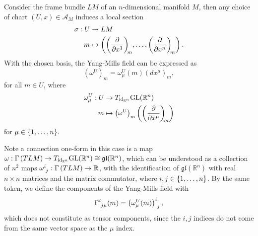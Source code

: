 \begin{example}
    Consider the frame bundle \(LM\) of an \(n\)-dimensional manifold \(M\), then any choice of chart \((U,x) \in \mathscr{A}_M\) induces a local section
    \begin{align*}
        \sigma : U &\to LM\\
                 m &\mapsto \left(\bvec{x^1}{m}, \dots, \bvec{x^n}{m}\right).
    \end{align*}
    With the chosen basis, the Yang-Mills field can be expressed as
    \begin{equation*}
        \left(\omega^U\right)_m = \omega^U_\mu (m) \left(dx^\mu\right)_m,
    \end{equation*}
    for all \(m \in U\), where
    \begin{align*}
        \omega^U_\mu : U &\to T_{\id{\mathbb{R}^n}}\mathrm{GL}(\mathbb{R}^n)\\
                       m &\mapsto \left(\omega^U\right)_m \left(\bvec{x^\mu}{m}\right)
    \end{align*}
    for \(\mu \in \{1, \dots, n\}.\)

    Note a connection one-form in this case is a map \(\omega : \Gamma\left(TLM\right) \to T_{\operatorname{id}_{\mathbb{R}^n}}\mathrm{GL}(\mathbb{R}^n)\cong \mathfrak{gl}(\mathbb{R}^n)\), which can be understood as a collection of \(n^2\) maps \(\omega\indices{^i_j} : \sections{TLM} \to \mathbb{R}\), with the identification of \(\mathfrak{gl}(\mathbb{R}^n)\) with real \(n\times n\) matrices and the matrix commutator, where \(i,j \in \{1,\dots,n\}\). By the same token, we define the components of the Yang-Mills field with
    \begin{equation*}
        \Gamma\indices{^i_{j\mu}}(m) = \left(\omega^U_\mu(m)\right)\indices{^i_j},
    \end{equation*}
    which does not constitute as tensor components, since the \(i,j\) indices do not come from the same vector space as the \(\mu\) index.
\end{example}
